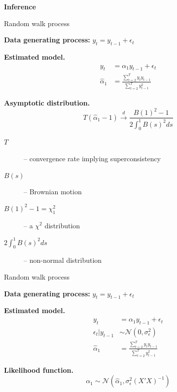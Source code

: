 \documentclass[notes,blackandwhite,mathsans]{beamer}
\begin{document}
{
\begin{frame}

\begin{adjustwidth}{-0.5cm}{0cm}
\vspace{8.3cm}\Large
\textbf{{\color{mcxs2}Inference} {\color{white}}}
\end{adjustwidth}

\end{frame}
}







\begin{frame}{Random walk process}

\textbf{Data generating process:} $y_t = y_{t-1} + \epsilon_t$

\bigskip\textbf{Estimated model.}
\begin{align*} 
y_t &= \alpha_1 y_{t-1} + \epsilon_t\\
\hat\alpha_1 &= \frac{\sum_{t=2}^{T}y_ty_{t-1}}{\sum_{t=2}^{T}y_{t-1}^2}
\end{align*} 

\textbf{Asymptotic distribution.}
$$ T\left(\hat\alpha_1 -1\right) \overset{d}{\rightarrow}\frac{B(1)^2-1}{2\int_{0}^{1}B(s)^2ds} $$

\begin{description}
\item[$T$]{\color{mcxs2}-- convergence rate implying} {\color{mcxs2}superconsistency}
\item[$B(s)$]{\color{mcxs2}-- Brownian motion}
\item[$B(1)^2-1 = \chi^2_1$]{\color{mcxs2}-- a $\chi^2$ distribution}
\item[$2\int_{0}^{1}B(s)^2ds$]{\color{mcxs2}-- non-normal distribution}
\end{description}

\end{frame}




\begin{frame}{Random walk process}

\textbf{Data generating process:} $y_t = y_{t-1} + \epsilon_t$

\bigskip\textbf{Estimated model.}
\begin{align*} 
y_t &= \alpha_1 y_{t-1} + \epsilon_t\\
\epsilon_t|y_{t-1}&\sim\mathcal{N}\left(0, \sigma_{\epsilon}^2\right)\\[1ex]
\hat\alpha_1 &= \frac{\sum_{t=2}^{T}y_ty_{t-1}}{\sum_{t=2}^{T}y_{t-1}^2}
\end{align*} 

\textbf{Likelihood function.}
$$ \alpha_1 \sim\mathcal{N}\left(\hat\alpha_1, \sigma_{\epsilon}^2(X'X)^{-1}\right) $$

\end{frame}
\end{document}
